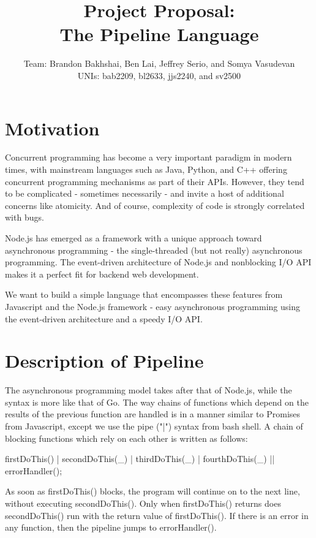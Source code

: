 \documentclass[11pt]{article}
\title{\textbf{Project Proposal:\\ The Pipeline Language}}
\author{Team: Brandon Bakhshai, Ben Lai, Jeffrey Serio, and Somya Vasudevan \\ UNIs: bab2209, bl2633, jjs2240, and sv2500}
\begin{document}
\maketitle
\thispagestyle{empty}
\renewcommand{\thesubsubsection}{\thesubsection.\alph{subsubsection}.}


\section{Motivation}
\hspace{0.5cm} Concurrent programming has become a very important paradigm in modern times, with mainstream languages such as Java, Python, and C++ offering concurrent programming mechanisms as part of their APIs. However, they tend to be complicated - sometimes necessarily - and invite a host of additional concerns like atomicity. And of course, complexity of code is strongly correlated with bugs.

Node.js has emerged as a framework with a unique approach toward asynchronous programming - the single-threaded (but not really) asynchronous programming. The event-driven architecture of Node.js and nonblocking I/O API makes it a perfect fit for backend web development.

We want to build a simple language that encompasses these features from Javascript and the Node.js framework - easy asynchronous programming using the event-driven architecture and a speedy I/O API.

\section{Description of Pipeline}

\hspace{0.5cm} The asynchronous programming model takes after that of Node.js, while the syntax is more like that of Go. The way chains of functions which depend on the results of the previous function are handled is in a manner similar to Promises from Javascript, except we use the pipe ("|") syntax from bash shell. A chain of blocking functions which rely on each other is written as follows:

firstDoThis() | secondDoThis(_) | thirdDoThis(_) | fourthDoThis(_) || errorHandler();

As soon as firstDoThis() blocks, the program will continue on to the next line, without executing secondDoThis(). Only when firstDoThis() returns does secondDoThis() run with the return value of firstDoThis(). If there is an error in any function, then the pipeline jumps to errorHandler().
\end{document}
